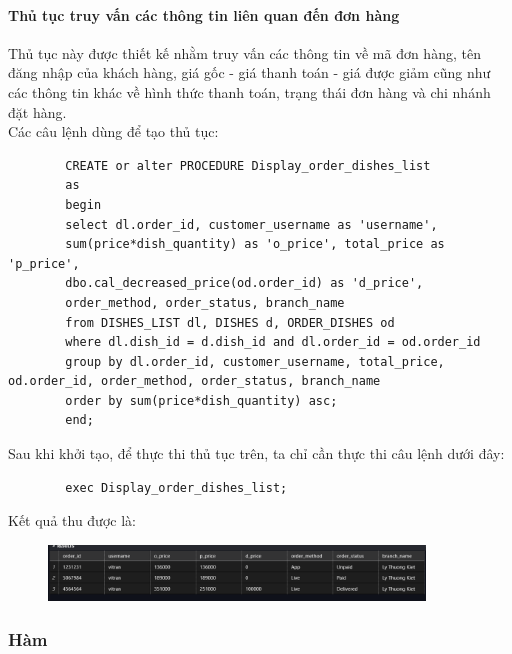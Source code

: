 \documentclass[13pt,a4paper]{article}
\begin{document}
	\paragraph{Thủ tục truy vấn các thông tin liên quan đến đơn hàng\\}
	Thủ tục này được thiết kế nhằm truy vấn các thông tin về mã đơn hàng, tên đăng nhập của khách hàng, giá gốc - giá thanh toán - giá được giảm cũng như các thông tin khác về hình thức thanh toán, trạng thái đơn hàng và chi nhánh đặt hàng. \\
	Các câu lệnh dùng để tạo thủ tục:
	\begin{lstlisting}
		CREATE or alter PROCEDURE Display_order_dishes_list
		as
		begin
		select dl.order_id, customer_username as 'username', 
		sum(price*dish_quantity) as 'o_price', total_price as 'p_price',
		dbo.cal_decreased_price(od.order_id) as 'd_price', 
		order_method, order_status, branch_name
		from DISHES_LIST dl, DISHES d, ORDER_DISHES od
		where dl.dish_id = d.dish_id and dl.order_id = od.order_id
		group by dl.order_id, customer_username, total_price, od.order_id, order_method, order_status, branch_name
		order by sum(price*dish_quantity) asc;
		end;
	\end{lstlisting}
	Sau khi khởi tạo, để thực thi thủ tục trên, ta chỉ cần thực thi câu lệnh dưới đây:
	\begin{lstlisting}
		exec Display_order_dishes_list;
	\end{lstlisting}
	Kết quả thu được là:
	\begin{figure}[h!]
		\begin{center}
			\includegraphics[width=10cm]{vitran/p_od_d_dl.png}
		\end{center}
	\end{figure}
	\subsubsection{Hàm}
\end{document}
